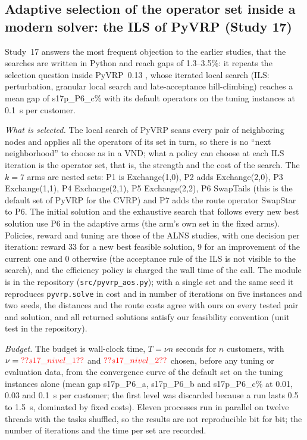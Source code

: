 \subsection{Adaptive selection of the operator set inside a modern solver: the ILS of PyVRP (Study 17)}\label{sec:s17design}
Study~17 answers the most frequent objection to the earlier studies, that the searches are written in Python and reach gaps of 1.3--3.5\%: it repeats the selection question inside PyVRP~0.13 \citep{wouda2024}, whose iterated local search (ILS: perturbation, granular local search and late-acceptance hill-climbing) reaches a mean gap of \num{s17p_P6_c}\% with its default operators on the tuning instances at 0.1~s per customer.

\emph{What is selected.} The local search of PyVRP scans every pair of neighboring nodes and applies all the operators of its set in turn, so there is no ``next neighborhood'' to choose as in a VND; what a policy can choose at each ILS iteration is the operator set, that is, the strength and the cost of the search. The $k=7$ arms are nested sets: P1 is Exchange(1,0), P2 adds Exchange(2,0), P3 Exchange(1,1), P4 Exchange(2,1), P5 Exchange(2,2), P6 SwapTails (this is the default set of PyVRP for the CVRP) and P7 adds the route operator SwapStar to P6. The initial solution and the exhaustive search that follows every new best solution use P6 in the adaptive arms (the arm's own set in the fixed arms). Policies, reward and tuning are those of the ALNS studies, with one decision per iteration: reward 33 for a new best feasible solution, 9 for an improvement of the current one and 0 otherwise (the acceptance rule of the ILS is not visible to the search), and the efficiency policy is charged the wall time of the call. The module is in the repository (\texttt{src/pyvrp\_aos.py}); with a single set and the same seed it reproduces \texttt{pyvrp.solve} in cost and in number of iterations on five instances and two seeds, the distances and the route costs agree with ours on every tested pair and solution, and all returned solutions satisfy our feasibility convention (unit test in the repository).

\emph{Budget.} The budget is wall-clock time, $T=\nu n$ seconds for $n$ customers, with $\nu=\num{s17_nivel_1}$ and $\num{s17_nivel_2}$ chosen, before any tuning or evaluation data, from the convergence curve of the default set on the tuning instances alone (mean gap \num{s17p_P6_a}, \num{s17p_P6_b} and \num{s17p_P6_c}\% at 0.01, 0.03 and 0.1~s per customer; the first level was discarded because a run lasts 0.5 to 1.5~s, dominated by fixed costs). Eleven processes run in parallel on twelve threads with the tasks shuffled, so the results are not reproducible bit for bit; the number of iterations and the time per set are recorded.

